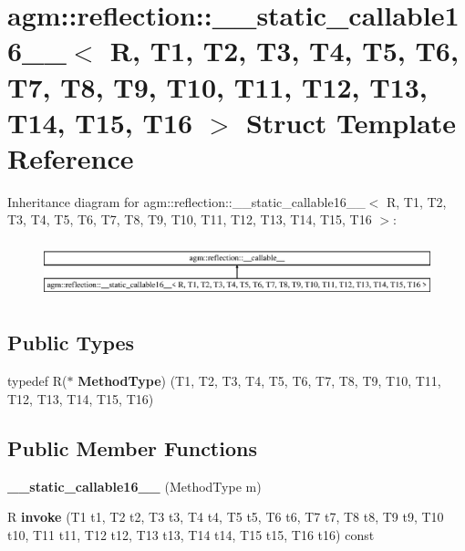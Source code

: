 \hypertarget{structagm_1_1reflection_1_1____static__callable16____}{}\section{agm\+:\+:reflection\+:\+:\+\_\+\+\_\+static\+\_\+callable16\+\_\+\+\_\+$<$ R, T1, T2, T3, T4, T5, T6, T7, T8, T9, T10, T11, T12, T13, T14, T15, T16 $>$ Struct Template Reference}
\label{structagm_1_1reflection_1_1____static__callable16____}
Inheritance diagram for agm\+:\+:reflection\+:\+:\+\_\+\+\_\+static\+\_\+callable16\+\_\+\+\_\+$<$ R, T1, T2, T3, T4, T5, T6, T7, T8, T9, T10, T11, T12, T13, T14, T15, T16 $>$\+:\begin{figure}[H]
\begin{center}
\leavevmode
\includegraphics[height=1.649485cm]{structagm_1_1reflection_1_1____static__callable16____}
\end{center}
\end{figure}
\subsection*{Public Types}
\begin{DoxyCompactItemize}
\item 
typedef R($\ast$ {\bfseries Method\+Type}) (T1, T2, T3, T4, T5, T6, T7, T8, T9, T10, T11, T12, T13, T14, T15, T16)\hypertarget{structagm_1_1reflection_1_1____static__callable16_____a4c68398710746c1d6033a9550dc5a857}{}\label{structagm_1_1reflection_1_1____static__callable16_____a4c68398710746c1d6033a9550dc5a857}

\end{DoxyCompactItemize}
\subsection*{Public Member Functions}
\begin{DoxyCompactItemize}
\item 
{\bfseries \+\_\+\+\_\+static\+\_\+callable16\+\_\+\+\_\+} (Method\+Type m)\hypertarget{structagm_1_1reflection_1_1____static__callable16_____a28481f1be773ea11765c6ec3f2c90716}{}\label{structagm_1_1reflection_1_1____static__callable16_____a28481f1be773ea11765c6ec3f2c90716}

\item 
R {\bfseries invoke} (T1 t1, T2 t2, T3 t3, T4 t4, T5 t5, T6 t6, T7 t7, T8 t8, T9 t9, T10 t10, T11 t11, T12 t12, T13 t13, T14 t14, T15 t15, T16 t16) const \hypertarget{structagm_1_1reflection_1_1____static__callable16_____ae394cf24741f8af91fe89b82f76ff48e}{}\label{structagm_1_1reflection_1_1____static__callable16_____ae394cf24741f8af91fe89b82f76ff48e}

\end{DoxyCompactItemize}
